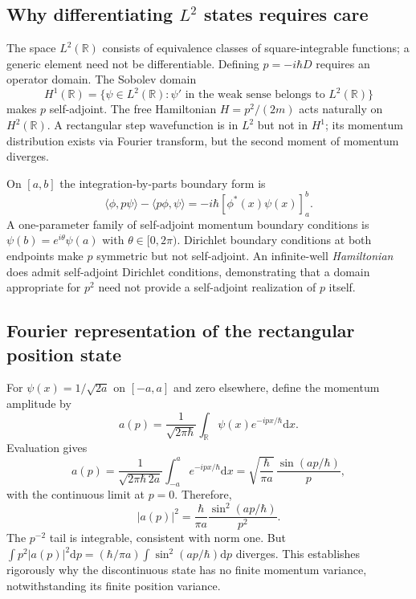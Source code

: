 \documentclass[11pt,a4paper]{article}
\newcommand{\dd}{\mathrm{d}}
\newcommand{\R}{\mathbb R}
\begin{document}
\subsection{Why differentiating $L^2$ states requires care}
The space $L^2(\R)$ consists of equivalence classes of square-integrable functions; a generic element need not be differentiable. Defining $p=-i\hbar D$ requires an operator domain. The Sobolev domain
\begin{equation}
H^1(\R)=\{\psi\in L^2(\R):\psi'\text{ in the weak sense belongs to }L^2(\R)\}
\end{equation}
makes $p$ self-adjoint. The free Hamiltonian $H=p^2/(2m)$ acts naturally on $H^2(\R)$. A rectangular step wavefunction is in $L^2$ but not in $H^1$; its momentum distribution exists via Fourier transform, but the second moment of momentum diverges.\par
On $[a,b]$ the integration-by-parts boundary form is
\begin{equation}
\langle\phi,p\psi\rangle-\langle p\phi,\psi\rangle=-i\hbar[\phi^*(x)\psi(x)]_{a}^{b}.
\end{equation}
A one-parameter family of self-adjoint momentum boundary conditions is $\psi(b)=e^{i\theta}\psi(a)$ with $\theta\in[0,2\pi)$. Dirichlet boundary conditions at both endpoints make $p$ symmetric but not self-adjoint. An infinite-well \emph{Hamiltonian} does admit self-adjoint Dirichlet conditions, demonstrating that a domain appropriate for $p^2$ need not provide a self-adjoint realization of $p$ itself.

\subsection{Fourier representation of the rectangular position state}
For $\psi(x)=1/\sqrt{2a}$ on $[-a,a]$ and zero elsewhere, define the momentum amplitude by
\begin{equation}
a(p)=\frac1{\sqrt{2\pi\hbar}}\int_{\R}\psi(x)e^{-ipx/\hbar}\dd x.
\end{equation}
Evaluation gives
\begin{equation}
a(p)=\frac1{\sqrt{2\pi\hbar\,2a}}\int_{-a}^{a}e^{-ipx/\hbar}\dd x
=\sqrt{\frac{\hbar}{\pi a}}\,\frac{\sin(ap/\hbar)}p,
\end{equation}
with the continuous limit at $p=0$. Therefore,
\begin{equation}
\boxed{|a(p)|^2=\frac{\hbar}{\pi a}\frac{\sin^2(ap/\hbar)}{p^2}}.
\end{equation}
The $p^{-2}$ tail is integrable, consistent with norm one. But $\int p^2|a(p)|^2\dd p=(\hbar/\pi a)\int\sin^2(ap/\hbar)\dd p$ diverges. This establishes rigorously why the discontinuous state has no finite momentum variance, notwithstanding its finite position variance.
\end{document}

